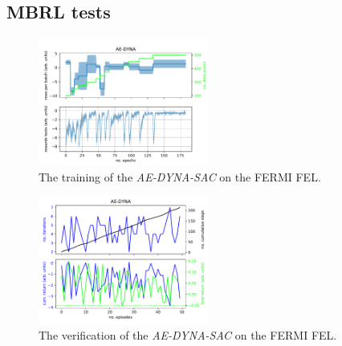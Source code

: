 \documentclass[
reprint,
amsmath,amssymb,amsfonts,clevref,
aps,
prstab,
]{revtex4-2}
\begin{document}
	\subsection{MBRL tests}
		
	\begin{figure}[!h]
		\centering
		\includegraphics*[width=0.5\textwidth]{Figures/AE-DYNA_observables.pdf}
		\caption{The training of the \emph{AE-DYNA-SAC} on the FERMI FEL.}
		\label{fig:AE-DYNA_observables}
	\end{figure}
	
	\begin{figure}[!h]
		\centering
		\includegraphics*[width=0.5\textwidth]{Figures/AE-DYNA_verification.pdf}
		\caption{The verification of the \emph{AE-DYNA-SAC} on the FERMI FEL.}
		\label{fig:AE-DYNA_verification}
	\end{figure}
	
\end{document}
